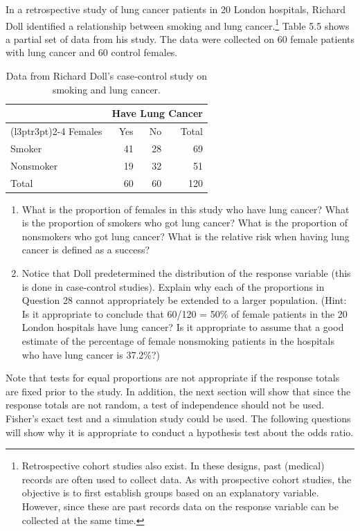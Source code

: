 \documentclass[
]{book}
\begin{document}
In a retrospective study of lung cancer patients in 20 London hospitals, Richard Doll identified a relationship between smoking and lung cancer.\footnote{Retrospective cohort studies also exist. In these designs, past (medical) records are often used to collect data. As with prospective cohort studies, the objective is to first establish groups based on an explanatory variable. However, since these are past records data on the response variable can be collected at the same time.} Table 5.5 shows a partial set of data from his study. The data were collected on 60 female patients with lung cancer and 60 control females.

\begin{table}[!h]
\centering
\caption{\label{tab:tab55} Data from Richard Doll’s case‐control study on smoking and lung cancer.}
\centering
\begin{tabular}[t]{lrrr}
\toprule
\multicolumn{1}{c}{ } & \multicolumn{3}{c}{Have Lung Cancer} \\
\cmidrule(l{3pt}r{3pt}){2-4}
Females & Yes & No & Total\\
\midrule
Smoker & 41 & 28 & 69\\
Nonsmoker & 19 & 32 & 51\\
Total & 60 & 60 & 120\\
\bottomrule
\end{tabular}
\end{table}

\begin{enumerate}
\def\labelenumi{\arabic{enumi}.}
\setcounter{enumi}{27}
\item
  What is the proportion of females in this study who have lung cancer? What is the proportion of smokers who got lung cancer? What is the proportion of nonsmokers who got lung cancer? What is the relative risk when having lung cancer is defined as a success?
\item
  Notice that Doll predetermined the distribution of the response variable (this is done in case‑control studies). Explain why each of the proportions in Question 28 cannot appropriately be extended to a larger population. (Hint: Is it appropriate to conclude that 60/120 = 50\% of female patients in the 20 London hospitals have lung cancer? Is it appropriate to assume that a good estimate of the percentage of female nonsmoking patients in the hospitals who have lung cancer is 37.2\%?)
\end{enumerate}

Note that tests for equal proportions are not appropriate if the response totals are fixed prior to the study. In addition, the next section will show that since the response totals are not random, a test of independence should not be used. Fisher's exact test and a simulation study could be used. The following questions will show why it is appropriate to conduct a hypothesis test about the odds ratio.
\end{document}
